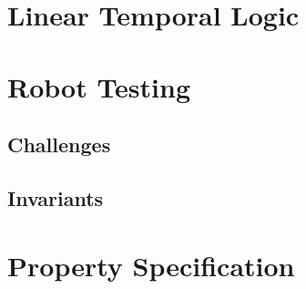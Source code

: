 \section{Linear Temporal Logic}
\label{sec:ltl}



\section{Robot Testing}
\label{sec:robottesting}

\subsection{Challenges}

\subsection{Invariants}

\section{Property Specification}
\label{sec:propspecification}
